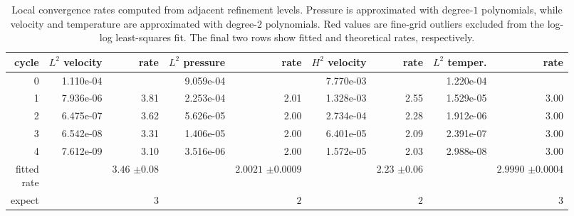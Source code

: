\begin{table}[htbp]
\centering
\begin{tabular}{|r|r|r|r|r|r|r|r|r|}
\hline
cycle & \makecell{$L^{2}$\\velocity} & rate & \makecell{$L^{2}$\\pressure} & rate & \makecell{$H^{2}$\\velocity} & rate & \makecell{$L^{2}$\\temper.} & rate \\ \hline
0 & 1.110e-04 & \makecell{--} & 9.059e-04 & \makecell{--} & 7.770e-03 & \makecell{--} & 1.220e-04 & \makecell{--} \\ \hline
1 & 7.936e-06 & 3.81 & 2.253e-04 & 2.01 & 1.328e-03 & 2.55 & 1.529e-05 & 3.00 \\ \hline
2 & 6.475e-07 & 3.62 & 5.626e-05 & 2.00 & 2.734e-04 & 2.28 & 1.912e-06 & 3.00 \\ \hline
3 & 6.542e-08 & 3.31 & 1.406e-05 & 2.00 & 6.401e-05 & 2.09 & 2.391e-07 & 3.00 \\ \hline
4 & 7.612e-09 & 3.10 & 3.516e-06 & 2.00 & 1.572e-05 & 2.03 & 2.988e-08 & 3.00 \\ \hline
\makecell[r]{fitted\\rate} & \makecell{--} & \makecell[r]{$3.46 $\\$\pm  0.08$} & \makecell{--} & \makecell[r]{$2.0021 $\\$\pm  0.0009$} & \makecell{--} & \makecell[r]{$2.23 $\\$\pm  0.06$} & \makecell{--} & \makecell[r]{$2.9990 $\\$\pm  0.0004$} \\ \hline
expect & \makecell{--} & $3$ & \makecell{--} & $2$ & \makecell{--} & $2$ & \makecell{--} & $3$ \\ \hline
\end{tabular}
\caption{Local convergence rates computed from adjacent refinement levels. Pressure is approximated with degree-$1$ polynomials, while velocity and temperature are approximated with degree-$2$ polynomials. Red values are fine-grid outliers excluded from the log-log least-squares fit. The final two rows show fitted and theoretical rates, respectively.}
\end{table}
